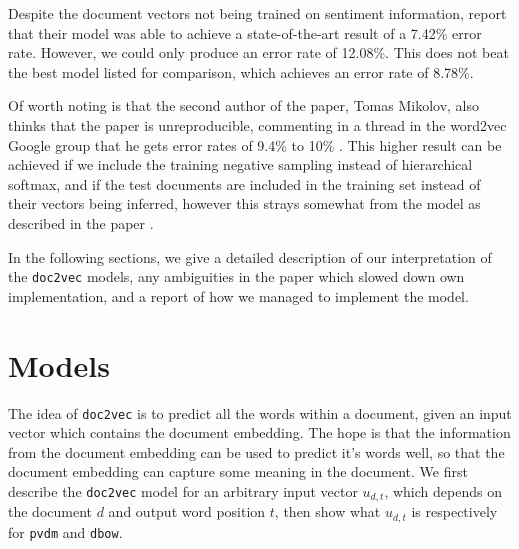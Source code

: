\documentclass{article}
\begin{document}
Despite the document vectors not being trained on sentiment information, \cite{le_distributed_2014} report that their model was able to achieve a state-of-the-art result of a 7.42\% error rate. However, we could only produce an error rate of 12.08\%. This does not beat the best model listed for comparison, which achieves an error rate of 8.78\%.

Of worth noting is that the second author of the paper, Tomas Mikolov, also thinks that the paper is unreproducible, commenting in a thread in the word2vec Google group that he gets error rates of 9.4\% to 10\% \cite{mikolov_distributed_2014} . This higher result can be achieved if we include the training negative sampling instead of hierarchical softmax, and if the test documents are included in the training set instead of their vectors being inferred, however this strays somewhat from the model as described in the paper \cite{mohr_rare-technologies/gensim_2017}.

In the following sections, we give a detailed description of our interpretation of the \texttt{doc2vec} models, any ambiguities in the paper which slowed down own implementation, and a report of how we managed to implement the model.

\section{Models}
The idea of \texttt{doc2vec} is to predict all the words within a document, given an input vector which contains the document embedding. The hope is that the information from the document embedding can be used to predict it's words well, so that the document embedding can capture some meaning in the document. We first describe the \texttt{doc2vec} model for an arbitrary input vector $u_{d,t}$, which depends on the document $d$ and output word position $t$, then show what $u_{d,t}$ is respectively for \texttt{pvdm} and \texttt{dbow}.
\end{document}
